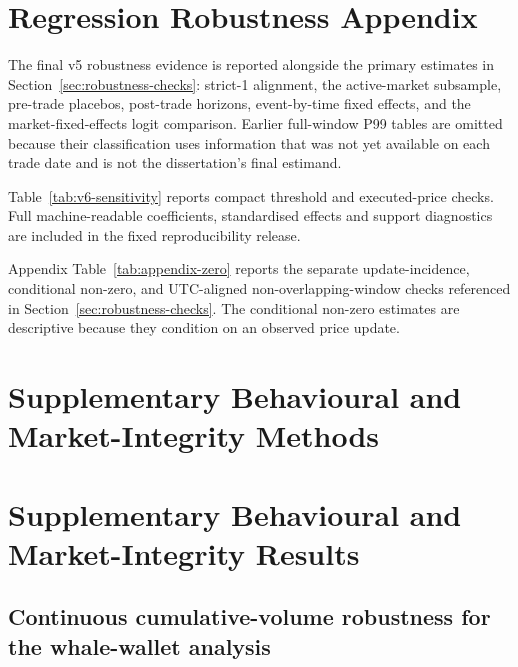 \section{Regression Robustness Appendix}
\label{sec:regression-appendix}

The final v5 robustness evidence is reported alongside the primary estimates in
Section~\ref{sec:robustness-checks}: strict-1 alignment, the active-market
subsample, pre-trade placebos, post-trade horizons, event-by-time fixed effects,
and the market-fixed-effects logit comparison. Earlier full-window P99 tables
are omitted because their classification uses information that was not yet
available on each trade date and is not the dissertation's final estimand.

Table~\ref{tab:v6-sensitivity} reports compact threshold and executed-price
checks. Full machine-readable coefficients, standardised effects and support
diagnostics are included in the fixed reproducibility release.



Appendix Table~\ref{tab:appendix-zero} reports the separate update-incidence,
conditional non-zero, and UTC-aligned non-overlapping-window checks referenced
in Section~\ref{sec:robustness-checks}. The conditional non-zero estimates are
descriptive because they condition on an observed price update.



\section{Supplementary Behavioural and Market-Integrity Methods}
\label{sec:supplementary-integrity-methods}



\section{Supplementary Behavioural and Market-Integrity Results}
\label{sec:supplementary-integrity-results}





\subsection{Continuous cumulative-volume robustness for the whale-wallet analysis}
\label{sec:continuous-wallet-volume-appendix}

